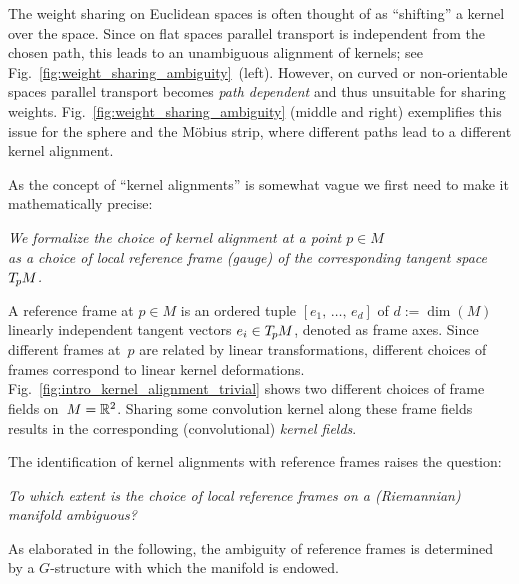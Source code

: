 The weight sharing on Euclidean spaces is often thought of as ``shifting'' a kernel over the space.
Since on flat spaces parallel transport is independent from the chosen path, this leads to an unambiguous alignment of kernels; see Fig.~\ref{fig:weight_sharing_ambiguity}~(left).
However, on curved or non-orientable spaces parallel transport becomes \emph{path dependent} and thus unsuitable for sharing weights.
Fig.~\ref{fig:weight_sharing_ambiguity} (middle and right) exemplifies this issue for the sphere and the M\"obius strip, where different paths lead to a different kernel alignment.


As the concept of ``kernel alignments'' is somewhat vague
we first need to make it mathematically precise:

\begin{minipage}{\textwidth}
\begin{center}\it
    We formalize the choice of kernel alignment at a point $p\in M$ \\
    as a choice of local reference frame (gauge)
    of the corresponding tangent space $T_{\mkern-1.5mu p}\mkern-.5muM$.
\end{center}
\end{minipage}

A reference frame at $p\in M$ is an ordered tuple $[e_1,\, \dots,\, e_d]$ of $d := \dim(M)$ linearly independent tangent vectors $e_i \in T_{\mkern-1.5mu p}\mkern-.5muM$, denoted as frame axes.
Since different frames at~$p$ are related by linear transformations, different choices of frames correspond to linear kernel deformations.
Fig.~\ref{fig:intro_kernel_alignment_trivial} shows two different choices of frame fields on~$M = \mathbb{R}^2$.
Sharing some convolution kernel along these frame fields results in the corresponding (convolutional) \emph{kernel fields}.


The identification of kernel alignments with reference frames raises the question:
\begin{center}\it
    To which extent is the choice of local reference frames on a (Riemannian) manifold ambiguous?
\end{center}
As elaborated in the following, the ambiguity of reference frames is determined by a $G$-structure with which the manifold is endowed.


